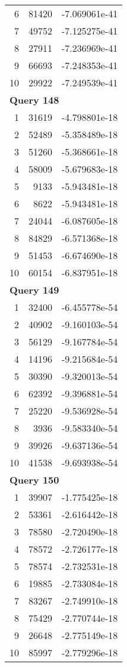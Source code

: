 \begin{longtable}[{p}]{@{}rrp{}@{}}
6 & 81420 & -7.069061e-41 \\
7 & 49752 & -7.125275e-41 \\
8 & 27911 & -7.236969e-41 \\
9 & 66693 & -7.248353e-41 \\
10 & 29922 & -7.249539e-41 \\
\midrule
\multicolumn{3}{l}{\bfseries Query 148} \\
1 & 31619 & -4.798801e-18 \\
2 & 52489 & -5.358489e-18 \\
3 & 51260 & -5.368661e-18 \\
4 & 58009 & -5.679683e-18 \\
5 & 9133 & -5.943481e-18 \\
6 & 8622 & -5.943481e-18 \\
7 & 24044 & -6.087605e-18 \\
8 & 84829 & -6.571368e-18 \\
9 & 51453 & -6.674690e-18 \\
10 & 60154 & -6.837951e-18 \\
\midrule
\multicolumn{3}{l}{\bfseries Query 149} \\
1 & 32400 & -6.455778e-54 \\
2 & 40902 & -9.160103e-54 \\
3 & 56129 & -9.167784e-54 \\
4 & 14196 & -9.215684e-54 \\
5 & 30390 & -9.320013e-54 \\
6 & 62392 & -9.396881e-54 \\
7 & 25220 & -9.536928e-54 \\
8 & 3936 & -9.583340e-54 \\
9 & 39926 & -9.637136e-54 \\
10 & 41538 & -9.693938e-54 \\
\midrule
\multicolumn{3}{l}{\bfseries Query 150} \\
1 & 39907 & -1.775425e-18 \\
2 & 53361 & -2.616442e-18 \\
3 & 78580 & -2.720490e-18 \\
4 & 78572 & -2.726177e-18 \\
5 & 78574 & -2.732531e-18 \\
6 & 19885 & -2.733084e-18 \\
7 & 83267 & -2.749910e-18 \\
8 & 75429 & -2.770744e-18 \\
9 & 26648 & -2.775149e-18 \\
10 & 85997 & -2.779296e-18 \\
\end{longtable}
